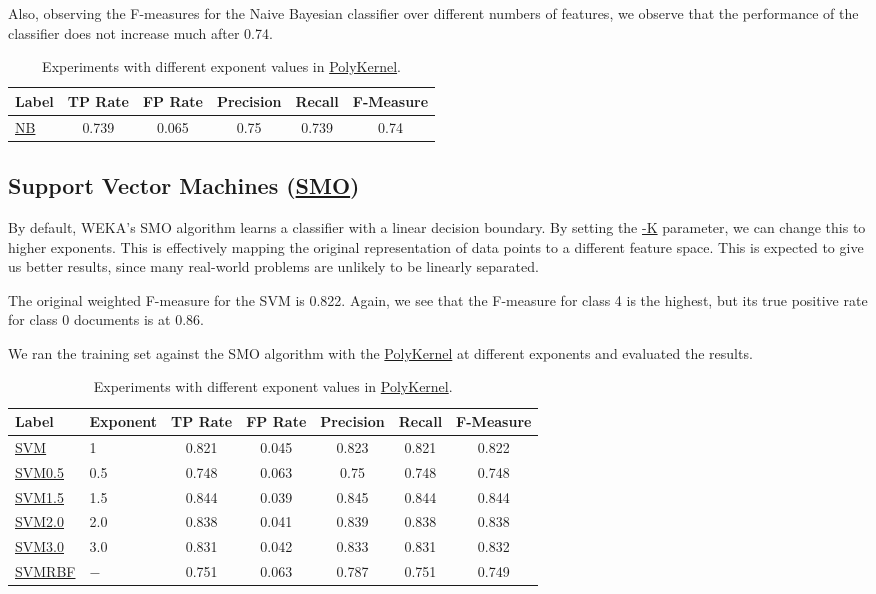 \documentclass[12pt]{article}
\begin{document}
Also, observing the F-measures for the Naive Bayesian classifier over different numbers of features, we observe that the performance of the classifier does not increase much after 0.74.
\begin{table}[h]
\linespread{1}
\centering
\begin{tabular}{|l |c c c c c|}
\hline
Label 		&	TP Rate & FP Rate & Precision & Recall  & F-Measure	 \\
\hline		
\url{NB} 	& 0.739 &    0.065   &   0.75 &     0.739   &  0.74 \\
\hline
\end{tabular}
\caption{Experiments with different exponent values in \url{PolyKernel}.}
\label{table:nb}
\end{table}


\subsection{Support Vector Machines (\url{SMO})}
By default, WEKA's SMO algorithm learns a classifier with a linear decision boundary. By setting the \url{-K} parameter, we can change this to higher exponents. This is effectively mapping the original representation of data points to a different feature space. This is expected to give us better results, since many real-world problems are unlikely to be linearly separated.

The original weighted F-measure for the SVM is 0.822. Again, we see that the F-measure for class 4 is the highest, but its true positive rate for class 0 documents is at 0.86.

We ran the training set against the SMO algorithm with the \url{PolyKernel} at different exponents and evaluated the results.
\begin{table}[h]
\linespread{1}
\centering
\begin{tabular}{|l |l|c c c c c|}
\hline
Label & Exponent	&	TP Rate & FP Rate & Precision & Recall  & F-Measure	 \\
\hline
\url{SVM} 	 & 1	&		0.821 &    0.045 &     0.823   &   0.821   &   0.822  \\
\url{SVM0.5} & 0.5 &	0.748 &    0.063 &     0.75    &   0.748   &   0.748  \\   
\url{SVM1.5} & 1.5	&	0.844 &    0.039 &     0.845   &   0.844   &   0.844  \\
\url{SVM2.0} & 2.0	&	0.838 &    0.041 &     0.839   &   0.838   &   0.838  \\
\url{SVM3.0} & 3.0	&	0.831 &    0.042 &     0.833   &   0.831   &   0.832  \\
\url{SVMRBF} & $-$	&	0.751 &    0.063 &     0.787   &   0.751   &   0.749  \\

\hline
\end{tabular}
\caption{Experiments with different exponent values in \url{PolyKernel}.}
\label{table:svm}
\end{table}
\end{document}

